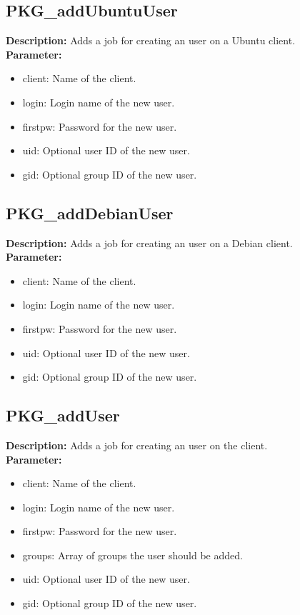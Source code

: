 \subsection{PKG\_addUbuntuUser}
\textbf{Description:} Adds a job for creating an user on a Ubuntu client.\\
\textbf{Parameter:}
\begin{itemize}
\item client: Name of the client.
\item login: Login name of the new user.
\item firstpw: Password for the new user.
\item uid: Optional user ID of the new user.
\item gid: Optional group ID of the new user.
\end{itemize}

\subsection{PKG\_addDebianUser}
\textbf{Description:} Adds a job for creating an user on a Debian client.\\
\textbf{Parameter:}
\begin{itemize}
\item client: Name of the client.
\item login: Login name of the new user.
\item firstpw: Password for the new user.
\item uid: Optional user ID of the new user.
\item gid: Optional group ID of the new user.
\end{itemize}

\subsection{PKG\_addUser}
\textbf{Description:} Adds a job for creating an user on the client.\\
\textbf{Parameter:}
\begin{itemize}
\item client: Name of the client.
\item login: Login name of the new user.
\item firstpw: Password for the new user.
\item groups: Array of groups the user should be added.
\item uid: Optional user ID of the new user.
\item gid: Optional group ID of the new user.
\end{itemize}

